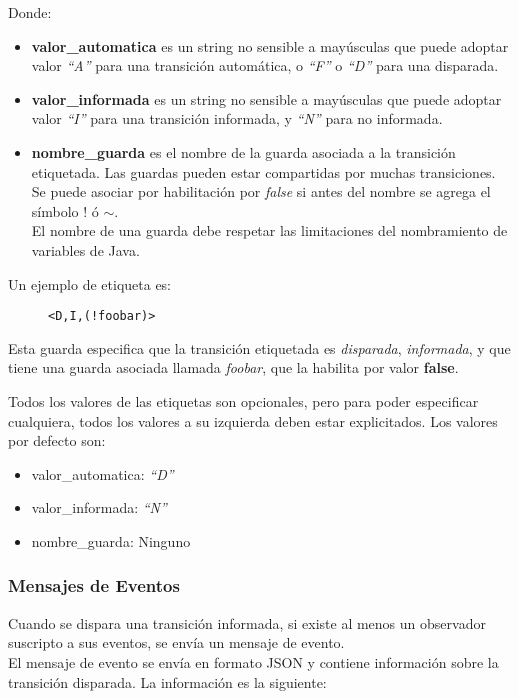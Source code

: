 Donde:
\begin{itemize}
    \item \textbf{valor\_automatica} es un string no sensible a mayúsculas que
    puede adoptar valor \textit{``A''} para una transición automática, o
    \textit{``F''} o \textit{``D''} para una disparada.
    \item \textbf{valor\_informada} es un string no sensible a mayúsculas que
    puede adoptar valor \textit{``I''} para una transición informada, y
    \textit{``N''} para no informada.
    \item \textbf{nombre\_guarda} es el nombre de la guarda asociada a la
    transición etiquetada. Las guardas pueden estar compartidas por muchas
    transiciones. Se puede asociar por habilitación por \textit{false} si antes
    del nombre se agrega el símbolo $!$ ó $\mathtt{\sim}$.\\
    El nombre de una guarda debe respetar las limitaciones del nombramiento de
    variables de Java.
\end{itemize}

Un ejemplo de etiqueta es:

\begin{figure}[H]
\centering
\begin{verbatim}
<D,I,(!foobar)>
\end{verbatim}
\end{figure}

Esta guarda especifica que la transición etiquetada es \textit{disparada},
\textit{informada}, y que tiene una guarda asociada llamada \textit{foobar}, que
la habilita por valor \textbf{false}.

Todos los valores de las etiquetas son opcionales, pero para poder especificar
cualquiera, todos los valores a su izquierda deben estar explicitados. Los
valores por defecto son:
\begin{itemize}
    \item valor\_automatica: \textit{``D''}
    \item valor\_informada: \textit{``N''}
    \item nombre\_guarda: Ninguno
\end{itemize}

\subsubsection{Mensajes de Eventos}
\label{mensaje_eventos}

Cuando se dispara una transición informada, si existe al menos un observador
suscripto a sus eventos, se envía un mensaje de evento.\\
El mensaje de evento se envía en formato JSON y contiene información sobre la
transición disparada. La información es la siguiente:

